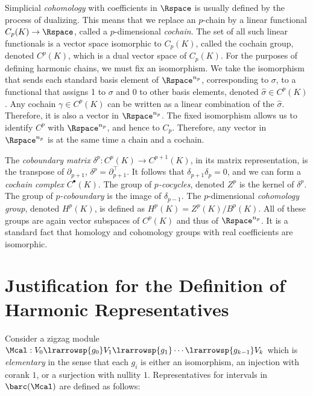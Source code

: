 Simplicial \textit{cohomology} with coefficients in $\Rspace$ is usually  defined by the process of dualizing. This means that we replace an $p$-chain by a linear functional $C_p(K) \rightarrow \Rspace$, called a $p$-dimensional \textit{cochain}. 
The set of all such linear functionals is a vector space isomorphic to $C_p(K)$, called the cochain group, denoted $C^p(K)$, which is a dual vector space of $C_p(K)$.  
For the purposes of defining harmonic chains, we must fix an isomorphism. 
We take the isomorphism that sends each standard basis element of $\Rspace^{n_p}$, corresponding to $\sigma$, to a functional that assigns 1 to $\sigma$ and 0 to other basis elements, denoted $\hat{\sigma} \in C^p(K)$. Any cochain $\gamma \in C^p(K)$ can be written as a linear combination of the $\hat{\sigma}$. Therefore, it is also a vector in $\Rspace^{n_p}$. The fixed isomorphism allows us to identify $C^p$ with $\Rspace^{n_p}$, and hence to $C_p$. Therefore, any vector in $\Rspace^{n_p}$ is at the same time a chain and a cochain.

The \textit{coboundary matrix} $\delta^p: C^p(K)\rightarrow C^{p+1}(K)$, in its matrix representation, is the transpose of $\partial_{p+1}$, $\delta^p = \partial_{p+1}^\top$. It follows that $\delta_{p+1}\delta_p=0$, and we can form a \textit{cochain complex} $C^{\bullet}(K)$. The group of \textit{$p$-cocycles}, denoted $Z^p$ is the kernel of $\delta^p$. The group of \textit{$p$-coboundary} is the image of $\delta_{p-1}$. The $p$-dimensional \textit{cohomology group}, denoted $H^p(K)$, is defined as $H^p(K) = Z^p(K)/B^p(K)$. All of these groups are again vector subspaces of $C^p(K)$ and thus of $\Rspace^{n_p}$.
It is a standard fact that homology and cohomology groups with real coefficients are isomorphic.
\newcommand{\img}{\mathrm{img}}

\section{Justification for the Definition of Harmonic Representatives}\label{sec:rep-just}

Consider a zigzag module $\Mcal:V_0\lrarrowsp{g_0}V_1\lrarrowsp{g_1}\cdots\lrarrowsp{g_{k-1}}V_k$
which is \emph{elementary} in the sense that each $g_i$
is either an isomorphism, an injection with corank $1$,
or a surjection with nullity $1$.
Representatives for intervals in $\barc(\Mcal)$
are defined as follows:

